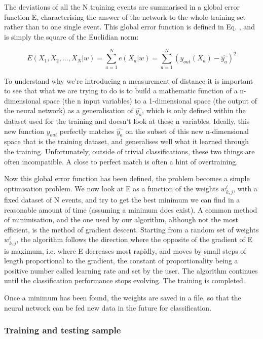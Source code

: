 The deviations of all the N training events are summarised in a global error function E, characterising the answer of the network to the whole training set rather than to one single event. This global error function is defined in Eq. , and is simply the square of the Euclidian norm:

\begin{equation}
    E(X_1, X_2, ..., X_N|w) = \sum_{a=1}^{N}{e(X_a|w)} = \sum_{a=1}^{N}{\left(y_{out}(X_a)-\hat{y_a}\right)^2}
    \label{wHyeuUUUUU}
\end{equation}

To understand why we’re introducing a measurement of distance it is important to see that what we are trying to do is to build a mathematic function of a n-dimensional space (the n input variables) to a 1-dimensional space (the output of the neural network) as a generalisation of $\hat{y_a}$, which is only defined within the dataset used for the training and doesn’t look at these n variables. Ideally, this new function $y_{out}$ perfectly matches $\hat{y_a}$ on the subset of this new n-dimensional space that is the training dataset, and generalises well what it learned through the training. Unfortunately, outside of trivial classifications, these two things are often incompatible. A close to perfect match is often a hint of overtraining.

Now this global error function has been defined, the problem becomes a simple optimisation problem. We now look at E as a function of the weights $w_{k,j} ^i$, with a fixed dataset of N events, and try to get the best minimum we can find in a reasonable amount of time (assuming a minimum does exist). A common method of minimisation, and the one used by our algorithm, although not the most efficient, is the method of gradient descent. Starting from a random set of weights $w_{k,j} ^i$, the algorithm follows the direction where the opposite of the gradient of E is maximum, i.e. where E decreases most rapidly, and moves by small steps of length proportional to the gradient, the constant of proportionality being a positive number called learning rate and set by the user. The algorithm continues until the classification performance stops evolving. The training is completed.

Once a minimum has been found, the weights are saved in a file, so that the neural network can be fed new data in the future for classification.

\subsubsection{Training and testing sample}

